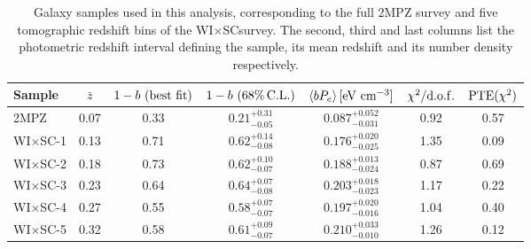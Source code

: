 \documentclass[useAMS,usenatbib]{mn2e}
\newcommand{\wisc}{WI$\times$SC}
\begin{document}
      \begin{table}
        \begin{center}
          \begin{tabular}{l|cccccc}
            \hline
            Sample & $\bar{z}$ & $1-b\,\,({\rm best\,\,fit})$ & $1-b\,\,(68\%\,{\rm C.L.})$ & $\langle bP_e\rangle\,[{\rm eV}\,\,{\rm cm}^{-3}]$ & $\chi^2/{\rm d.o.f.}$ & ${\rm PTE}(\chi^2)$\\
            \hline
            2MPZ    & 0.07     & 0.33                         & $0.21^{+0.31}_{-0.05}$      & $0.087^{+0.052}_{-0.031}$                          & 0.92                  & 0.57               \\
            \wisc-1 & 0.13     & 0.71                         & $0.62^{+0.14}_{-0.08}$      & $0.176^{+0.020}_{-0.025}$                          & 1.35                  & 0.09               \\
            \wisc-2 & 0.18     & 0.73                         & $0.62^{+0.10}_{-0.07}$      & $0.188^{+0.013}_{-0.024}$                          & 0.87                  & 0.69               \\
            \wisc-3 & 0.23     & 0.64                         & $0.64^{+0.07}_{-0.08}$      & $0.203^{+0.018}_{-0.023}$                          & 1.17                  & 0.22               \\
            \wisc-4 & 0.27     & 0.55                         & $0.58^{+0.07}_{-0.07}$      & $0.197^{+0.020}_{-0.016}$                          & 1.04                  & 0.40               \\
            \wisc-5 & 0.32     & 0.58                         & $0.61^{+0.09}_{-0.07}$      & $0.210^{+0.033}_{-0.010}$                          & 1.26                  & 0.12               \\
            \hline
          \end{tabular}
          \caption{Galaxy samples used in this analysis, corresponding to the full 2MPZ survey and five tomographic redshift bins of the \wisc survey. The second, third and last columns list the photometric redshift interval defining the sample, its mean redshift and its number density respectively.}\label{tab:results}
        \end{center}
      \end{table}
\end{document}
